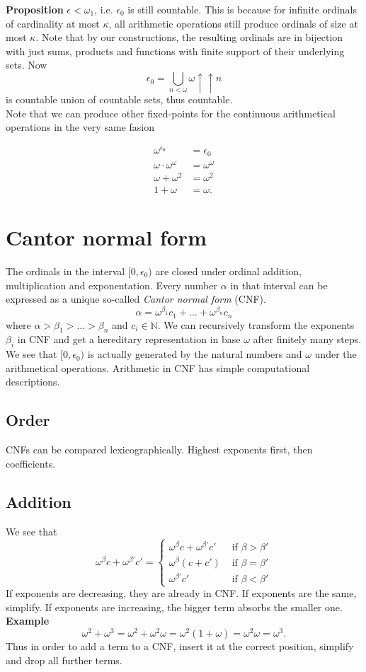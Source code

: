 \textbf{Proposition} $\epsilon < \omega_1$, i.e. $\epsilon_0$ is still countable.
This is because for infinite ordinals of cardinality at most $\kappa$, all arithmetic operations still produce ordinals of size at most $\kappa$. Note that by our constructions, the resulting ordinals are in bijection with just sums, products and functions with finite support of their underlying sets. 
Now
\[ \epsilon_0 = \bigcup_{n < \omega} \omega \uparrow \uparrow n \]
is countable union of countable sets, thus countable. \\

Note that we can produce other fixed-points for the continuous arithmetical operations in the very same fasion

\begin{align*}
\omega^{\epsilon_0} &= \epsilon_0 \\
\omega\cdot \omega^\omega &= \omega^\omega \\
\omega + \omega^2 &= \omega^2 \\
1 + \omega &= \omega.
\end{align*}

\section{Cantor normal form}
The ordinals in the interval $[0,\epsilon_0)$ are closed under ordinal addition, multiplication and exponentation. Every number $\alpha$ in that interval can be expressed as a unique so-called \emph{Cantor normal form} (CNF). 
\[ \alpha = \omega^{\beta_1}c_1 + \ldots + \omega^{\beta_n}c_n \]
where $\alpha > \beta_1 > \ldots > \beta_n$ and $c_i \in \mathbb N$. 
We can recursively transform the exponents $\beta_i$ in CNF and get a hereditary representation in base $\omega$ after finitely many steps. We see that $[0,\epsilon_0)$ is actually generated by the natural numbers and $\omega$ under the arithmetical operations.  Arithmetic in CNF has simple computational descriptions.

\subsection{Order}
CNFs can be compared lexicographically. Highest exponents first, then coefficients. 

\subsection{Addition}
We see that
\[
\omega^\beta c + \omega^{\beta'}c' = \begin{cases}
	\omega^\beta c + \omega^{\beta'}c' & \text{ if } \beta > \beta' \\
	\omega^\beta (c+c') & \text{ if } \beta = \beta' \\
	\omega^{\beta'}c' & \text{ if } \beta < \beta'
\end{cases}
\]
If exponents are decreasing, they are already in CNF. If exponents are the same, simplify. If exponents are increasing, the bigger term absorbs the smaller one.
\textbf{Example}
\[ \omega^2 + \omega^3 = \omega^2 + \omega^2\omega = \omega^2(1+\omega) = \omega^2\omega = \omega^3. \]
Thus in order to add a term to a CNF, insert it at the correct position, simplify and drop all further terms.

